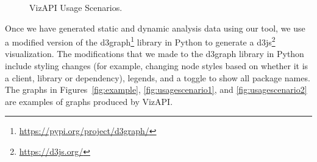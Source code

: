 \begin{figure}[h]
\begin{center}

\hspace{7mm}

\caption{\label{fig:usagescenarios} VizAPI Usage Scenarios.}

\end{center}
\end{figure}


Once we have generated static and dynamic analysis data using our tool, we use a modified version
of the d3graph\footnote{\url{https://pypi.org/project/d3graph/}} library in Python to generate a d3js\footnote{\url{https://d3js.org/}}
visualization. The modifications that we made to the d3graph  library in Python include styling changes (for example, changing node styles based on whether it is a client, library or dependency),
legends, and a toggle to show all package names. 
The graphs in Figures~\ref{fig:example}, \ref{fig:usagescenario1}, and \ref{fig:usagescenario2} are examples of graphs produced by VizAPI.

